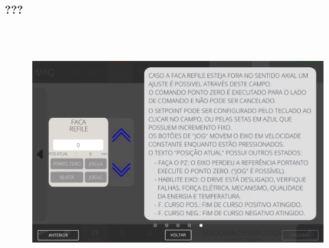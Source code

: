 \newpage
\thispagestyle{fancy}
\vspace*{\fill}
\subsubsection{\small{???}}
\begin{figure}[h]
  \centering
  \includegraphics[width=576px,height=360px]{src/imagesFlexo/05-slotter/settings/e-11.png}
   \label{}
\end{figure}
\vspace*{\fill}